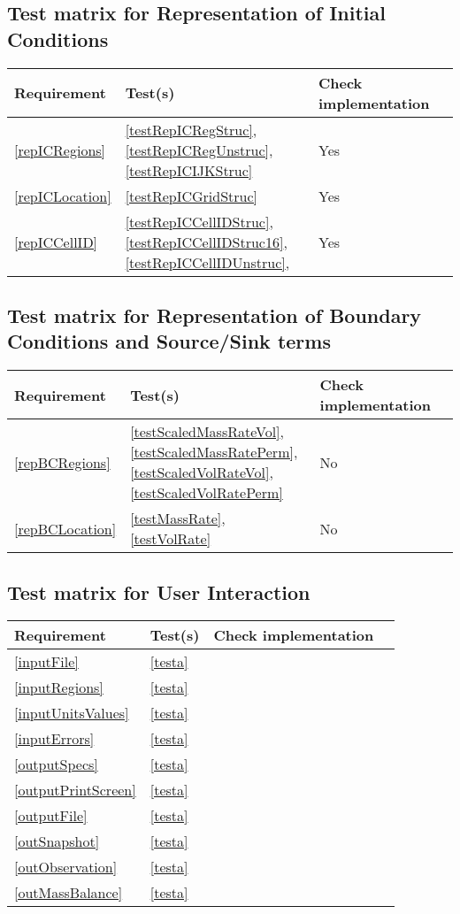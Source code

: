 \subsection{Test matrix for Representation of Initial Conditions}
\begin{tabular}{|l|l|l|l|}
	\hline
	Requirement & Test(s) & Check implementation \\
	\hline
	\hline
	\ref{repICRegions} & \ref{testRepICRegStruc}, \ref{testRepICRegUnstruc}, \ref{testRepICIJKStruc}  & Yes \\
	\hline
	\ref{repICLocation} &  \ref{testRepICGridStruc} & Yes \\
	\hline
	\ref{repICCellID} & \ref{testRepICCellIDStruc}, \ref{testRepICCellIDStruc16}, \ref{testRepICCellIDUnstruc}, & Yes\\
	\hline
\end{tabular}

\subsection{Test matrix for Representation of Boundary Conditions and Source/Sink terms}
\begin{tabular}{|l|l|l|l|}
	\hline
	Requirement & Test(s) & Check implementation \\
	\hline
	\hline
	\ref{repBCRegions}& \ref{testScaledMassRateVol}, \ref{testScaledMassRatePerm}, 
	\ref {testScaledVolRateVol}, \ref{testScaledVolRatePerm} & No \\
	\hline
	\ref{repBCLocation} & \ref{testMassRate}, \ref{testVolRate} & No \\
	\hline
\end{tabular}

\subsection{Test matrix for User Interaction}
\begin{tabular}{|l|l|l|l|}
	\hline
	Requirement & Test(s) & Check implementation \\
	\hline
	\hline
		\ref{inputFile} & \ref{testa} \\
	\hline
		\ref{inputRegions} & \ref{testa} \\
	\hline
		\ref{inputUnitsValues} & \ref{testa} \\
	\hline
		\ref{inputErrors} & \ref{testa} \\
	\hline
		\ref{outputSpecs} & \ref{testa} \\
	\hline
		\ref{outputPrintScreen} & \ref{testa} \\
	\hline
		\ref{outputFile} & \ref{testa} \\
	\hline
		\ref{outSnapshot} & \ref{testa} \\
	\hline
		\ref{outObservation} & \ref{testa} \\
	\hline
		\ref{outMassBalance} & \ref{testa} \\
	\hline
\end{tabular}

